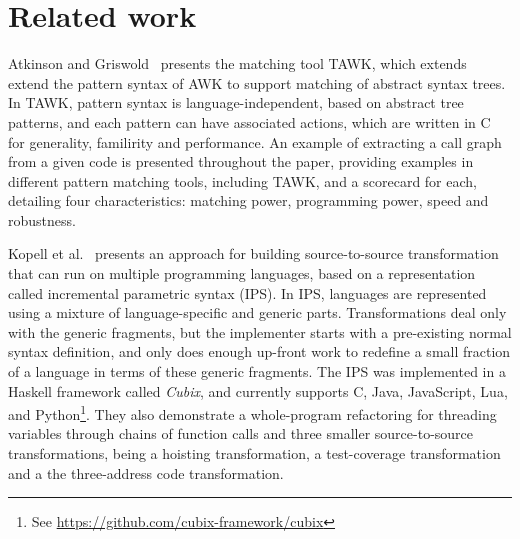 \begin{example}
\end{example}

\section{Related work}\label{sec:related-work}

Atkinson and Griswold~\cite{atkinson2006-effective-pattern-matching} presents 
the matching tool TAWK, which extends extend the pattern syntax of AWK to 
support matching of abstract syntax trees. In TAWK, pattern syntax is 
language-independent, based on abstract tree patterns, and each pattern can 
have associated actions, which are written in C for generality, familirity 
and performance. An example of extracting a call graph from a given code is 
presented throughout the paper, providing examples in different pattern matching 
tools, including TAWK, and a scorecard for each, detailing four characteristics:
matching power, programming power, speed and robustness.

Kopell et al.~\cite{kopell2018-language-parametric-transformation} presents an
approach for building source-to-source transformation that can run on multiple
programming languages, based on a representation called incremental parametric
syntax (IPS).
In IPS, languages are represented using a mixture of language-specific and 
generic parts. Transformations deal only with the generic fragments, but 
the implementer starts with a pre-existing normal syntax definition, and 
only does enough up-front work to redefine a small fraction of a language 
in terms of these generic fragments.
The IPS was implemented in a Haskell framework called \textit{Cubix}, 
and currently supports C, Java, JavaScript, Lua, and Python\footnote{
See \url{https://github.com/cubix-framework/cubix}}.
They also demonstrate a whole-program refactoring for threading variables
through chains of function calls and three smaller source-to-source 
transformations, being a hoisting transformation, a test-coverage 
transformation and a the three-address code transformation.


